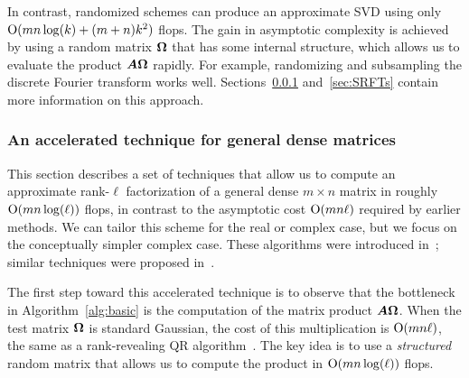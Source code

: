 \documentclass{article}
\begin{document}
In contrast, randomized schemes can produce an approximate SVD using
only $\mathrm{O}(mn\log(k) + (m+n)k^2)$ flops.  The gain in asymptotic
complexity is achieved by using a random matrix $\bm{\Omega}$ that
has some internal structure, which allows us to evaluate the
product $\bm{A\Omega}$ rapidly.  For example,
randomizing and subsampling the discrete Fourier transform
works well.  Sections~\ref{sec:ailonchazelle} and~\ref{sec:SRFTs}
contain more information on this approach.

\subsubsection{An accelerated technique for general dense matrices}
\label{sec:ailonchazelle}

This section describes a set of techniques that allow us to compute
an approximate rank-$\ell$ factorization of a general dense $m \times n$
matrix in roughly $\mathrm{O}(mn\log(\ell))$ flops, in contrast to the
asymptotic cost $\mathrm{O}(mn\ell)$ required by earlier methods.
We can tailor this scheme for the real or complex case, but we focus on
the conceptually simpler complex case.
These algorithms were introduced in~\cite{random2};
similar techniques were proposed in~\cite{Sar06:Improved-Approximation}.


The first step toward this accelerated technique is to observe that
the bottleneck in Algorithm~\ref{alg:basic} is the computation of
the matrix product $\bm{A\Omega}$.  When the test matrix $\bm{\Omega}$
is standard Gaussian, the cost of this multiplication is $\mathrm{O}(mn\ell)$,
the same as a rank-revealing QR algorithm~\cite{gu_rrqr}.  The key
idea is to use a \emph{structured} random matrix that allows us to
compute the product in $\mathrm{O}(mn \log(\ell))$ flops.
\end{document}
